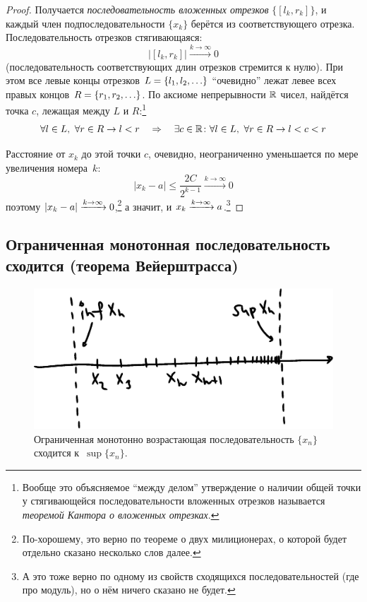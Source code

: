 \documentclass[a4paper,12pt]{article}
\begin{document}
\begin{proof}
    Получается \emph{последовательность вложенных отрезков} $\bigl\{[l_k, r_k]\bigr\}$, и каждый член подпоследовательности $\{x_k\}$ берётся из соответствующего отрезка.
    Последовательность отрезков стягивающаяся:
    \[
      \bigl|[l_k, r_k]\bigr| \xrightarrow{k\to \infty} 0
    \]
    (последовательность соответствующих длин отрезков стремится к нулю).
    При этом все левые концы отрезков $L \hm= \{l_1, l_2, \ldots\}$ ``очевидно'' лежат левее всех правых концов $R \hm= \{r_1, r_2, \ldots\}$.
    По аксиоме непрерывности $\operatorname{\mathbb R}$ чисел, найдётся точка $c$, лежащая между $L$ и $R$:\footnote{
      Вообще это объясняемое ``между делом'' утверждение о наличии общей точки у стягивающейся последовательности вложенных отрезков называется \emph{теоремой Кантора о вложенных отрезках}.
    }
    \[
      \forall l \in L,\ \forall r \in R \to l < r \quad\Rightarrow\quad \exists c \in \operatorname{\mathbb R}\colon \forall l \in L,\ \forall r \in R \to l < c < r
    \]
    
    Расстояние от $x_k$ до этой точки $c$, очевидно, неограниченно уменьшается по мере увеличения номера~$k$:
    \[
      |x_k - a| \leq \frac{2C}{2^{k - 1}} \xrightarrow{k \to \infty} 0
    \]
    поэтому $|x_k - a| \hm{\xrightarrow{k \to \infty}} 0$,\footnote{
      По-хорошему, это верно по теореме о двух милиционерах, о которой будет отдельно сказано несколько слов далее.
    } а значит, и $x_k \hm{\xrightarrow{k \to \infty}} a$.\footnote{
      А это тоже верно по одному из свойств сходящихся последовательностей (где про модуль), но о нём ничего сказано не будет.
    }
    
  \end{proof}
  
  
  \subsection{Ограниченная монотонная последовательность сходится (теорема Вейерштрасса)}
  
  \begin{figure}[ht]
    \centering
    \includegraphics[width=0.6\linewidth]{images/ve}
    
    \caption{
      Ограниченная монотонно возрастающая последовательность $\{x_n\}$ сходится к~$\sup \{x_n\}$.
    }
    \label{fig:ve}
  \end{figure}
  
\end{document}
